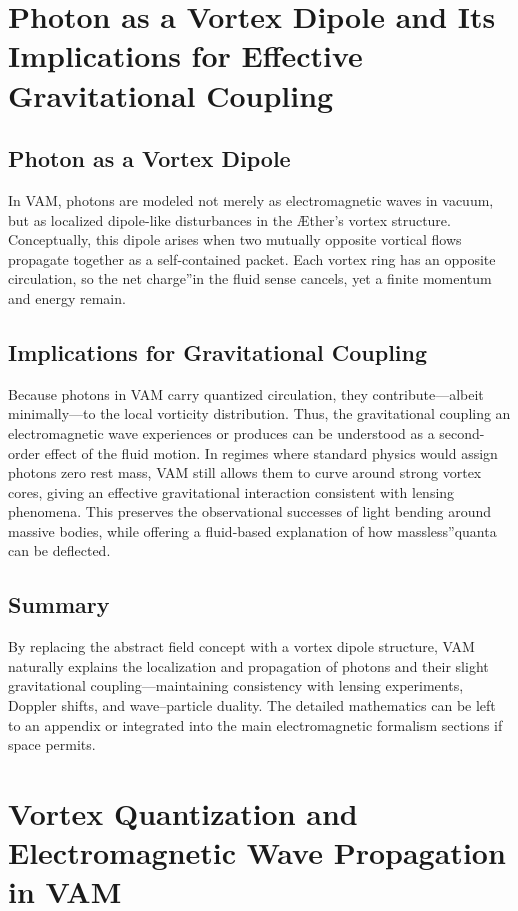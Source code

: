 \section{Photon as a Vortex Dipole and Its Implications for Effective Gravitational Coupling}

\subsection{Photon as a Vortex Dipole}
In VAM, photons are modeled not merely as electromagnetic waves in vacuum, but as localized dipole-like disturbances in the Æther's vortex structure. Conceptually, this dipole arises when two mutually opposite vortical flows propagate together as a self-contained packet. Each vortex ring has an opposite circulation, so the net \grqq charge\textquotedblright in the fluid sense cancels, yet a finite momentum and energy remain.

\subsection{Implications for Gravitational Coupling}
Because photons in VAM carry quantized circulation, they contribute—albeit minimally—to the local vorticity distribution. Thus, the gravitational coupling an electromagnetic wave experiences or produces can be understood as a second-order effect of the fluid motion. In regimes where standard physics would assign photons zero rest mass, VAM still allows them to curve around strong vortex cores, giving an effective gravitational interaction consistent with lensing phenomena. This preserves the observational successes of light bending around massive bodies, while offering a fluid-based explanation of how \grqq massless\textquotedblright quanta can be deflected.

\subsection{Summary}
By replacing the abstract field concept with a vortex dipole structure, VAM naturally explains the localization and propagation of photons and their slight gravitational coupling—maintaining consistency with lensing experiments, Doppler shifts, and wave–particle duality. The detailed mathematics can be left to an appendix or integrated into the main electromagnetic formalism sections if space permits.

\section{Vortex Quantization and Electromagnetic Wave Propagation in VAM}

